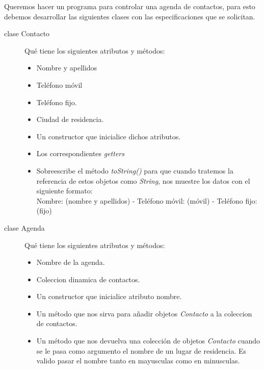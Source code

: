 \documentclass[addpoints,12pt]{exam}
\begin{document}
\begin{center}
\end{center}
\vspace{0.1in}
\begin{questions}
\question Queremos hacer un programa para controlar una agenda de contactos, para esto debemos desarrollar las siguientes clases con las especificaciones que se solicitan.
\begin{description}
\item[clase Contacto] Qué tiene los siguientes atributos y métodos:
\begin{itemize}
\item Nombre y apellidos
\item Teléfono móvil
\item Teléfono fijo.
\item Ciudad de residencia.
\item Un constructor que inicialice dichos atributos.
\item Los correspondientes \emph{getters}
\item Sobreescribe el método \emph{toString()} para que cuando tratemos la referencia de estos objetos como \emph{String}, nos muestre los datos con el siguiente formato:\\
Nombre: (nombre y apellidos) - Teléfono móvil: (móvil) - Teléfono fijo: (fijo)
\end{itemize}
\item[clase Agenda] Qué tiene los siguientes atributos y métodos:
\begin{itemize}
\item Nombre de la agenda.
\item Coleccion dinamica de contactos.
\item Un constructor que inicialice atributo nombre.
\item Un método que nos sirva para añadir objetos \textit{Contacto} a la coleccion de contactos.
\item Un método que nos devuelva una colección de objetos \emph{Contacto} cuando se le pasa como argumento el nombre de un lugar de residencia.  Es valido pasar el nombre tanto en mayusculas como en minusculas.

\end{itemize}
\end{description}
\end{questions}
\end{document}
